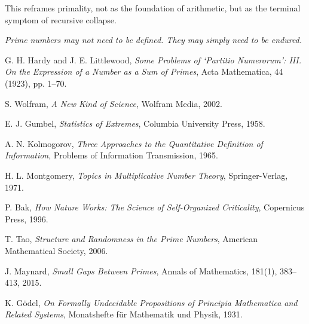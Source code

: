 \documentclass[11pt]{article}
\begin{document}
This reframes primality, not as the foundation of arithmetic, but as the terminal symptom of recursive collapse.


\textit{Prime numbers may not need to be defined. They may simply need to be endured.}


\begin{thebibliography}{9}

G. H. Hardy and J. E. Littlewood,
\textit{Some Problems of ‘Partitio Numerorum’: III. On the Expression of a Number as a Sum of Primes},
Acta Mathematica, 44 (1923), pp. 1–70.

S. Wolfram,
\textit{A New Kind of Science},
Wolfram Media, 2002.

E. J. Gumbel,
\textit{Statistics of Extremes},
Columbia University Press, 1958.

A. N. Kolmogorov,
\textit{Three Approaches to the Quantitative Definition of Information},
Problems of Information Transmission, 1965.

H. L. Montgomery,
\textit{Topics in Multiplicative Number Theory},
Springer-Verlag, 1971.

P. Bak,
\textit{How Nature Works: The Science of Self-Organized Criticality},
Copernicus Press, 1996.

T. Tao,
\textit{Structure and Randomness in the Prime Numbers},
American Mathematical Society, 2006.

J. Maynard,
\textit{Small Gaps Between Primes},
Annals of Mathematics, 181(1), 383–413, 2015.

K. Gödel, 
\textit{On Formally Undecidable Propositions of Principia Mathematica and Related Systems}, 
Monatshefte für Mathematik und Physik, 1931.


\end{thebibliography}

\date{}
\end{document}
